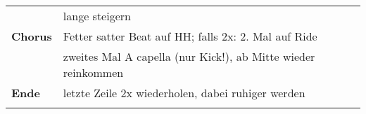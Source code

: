 \begin{tabular}{p{1.6cm}l}
                    & lange steigern                                                           \\
    \textbf{Chorus} & Fetter satter Beat auf HH; falls 2x: 2. Mal auf Ride                     \\
                    & zweites Mal A capella (nur Kick!), ab Mitte wieder reinkommen            \\
    \textbf{Ende}   & letzte Zeile 2x wiederholen, dabei ruhiger werden                        \\
                    &                                                                          \\
\end{tabular}
